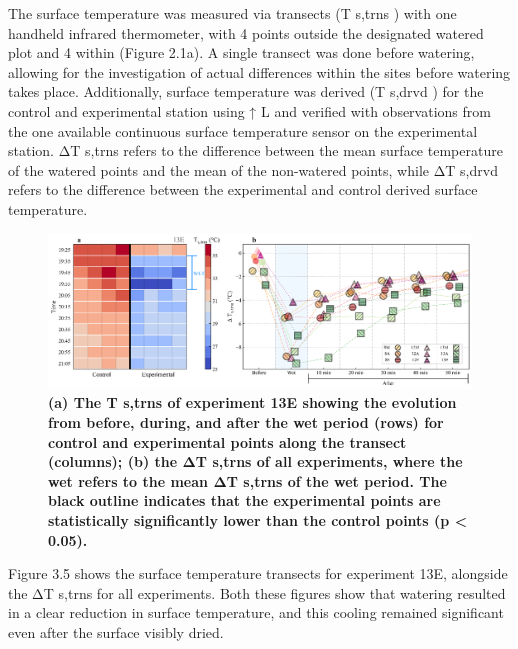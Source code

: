 \documentclass[final,3p,times,authoryear]{elsarticle}
\begin{document}
The surface temperature was measured via transects (T s,trns ) with one handheld infrared
thermometer, with 4 points outside the designated watered plot and 4 within (Figure
2.1a). A single transect was done before watering, allowing for the investigation of
actual differences within the sites before watering takes place. Additionally, surface
temperature was derived (T s,drvd ) for the control and experimental station using ↑ L and
verified with observations from the one available continuous surface temperature sensor
on the experimental station. ΔT s,trns refers to the difference between the mean surface
temperature of the watered points and the mean of the non-watered points, while ΔT s,drvd
refers to the difference between the experimental and control derived surface
temperature.


\begin{figure}
\centering
\includegraphics[trim={0 0 0 0},clip,scale=1.0]{pict016.png}
\caption{\bf (a) The T s,trns of experiment 13E showing the evolution from before, during, and after the wet
period (rows) for control and experimental points along the transect (columns); (b) the ΔT s,trns of all
experiments, where the wet refers to the mean ΔT s,trns of the wet period. The black outline indicates that
the experimental points are statistically significantly lower than the control points (p < 0.05).}
 \label{fig:3.5}
\end{figure}

Figure 3.5 shows the surface temperature transects for experiment 13E, alongside the
ΔT s,trns for all experiments. Both these figures show that watering resulted in a clear
reduction in surface temperature, and this cooling remained significant even after the
surface visibly dried.
\end{document}

